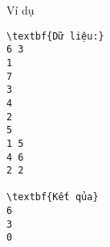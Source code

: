Ví dụ
\begin{verbatim}
\textbf{Dữ liệu:}
6 3
1
7
3
4
2
5
1 5
4 6
2 2

\textbf{Kết qủa}
6
3
0
\end{verbatim}